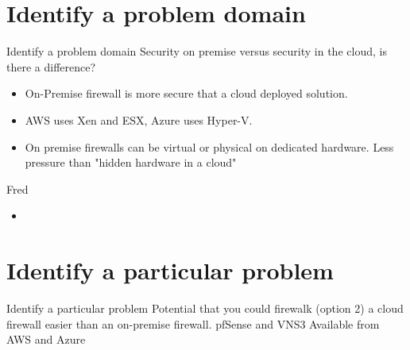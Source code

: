 \documentclass[12pt]{report}
\begin{document}
\section*{Identify a problem domain}
Identify a problem domain
\newline
Security on premise versus security in the cloud, is there a difference?
\newline

\begin{itemize}
\item On-Premise firewall is more secure that a cloud deployed solution.
\item AWS uses Xen and ESX, Azure uses Hyper-V.
\item On premise firewalls can be virtual or physical on dedicated hardware. Less pressure than "hidden hardware in a cloud"
\end{itemize}
Fred
\begin{itemize}
\item \lipsum[2]
\end{itemize}

\newpage
\section*{Identify a particular problem}

Identify a particular problem
\newline
Potential that you could firewalk  (option 2) a cloud firewall easier than an on-premise firewall.
pfSense and VNS3 Available from AWS and Azure
\end{document}
